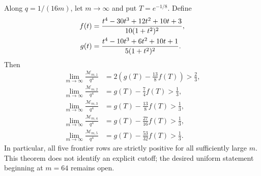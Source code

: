 \begin{theorem}
\label{thm:terminal-modal-static-frontier-first-order}
Along $q=1/(16m)$, let $m\to\infty$ and put $T=e^{-1/8}$.  Define
\begin{align}
 f(t)&=\frac{t^4-30t^3+12t^2+10t+3}
 {10(1+t^2)^2},\notag\\
 g(t)&=\frac{t^4-10t^3+6t^2+10t+1}
 {5(1+t^2)^2}.
 \label{eq:terminal-modal-static-frontier-fg}
\end{align}
Then
\begin{align}
 \lim_{m\to\infty}\frac{\mathcal M_{m,1}}{q^4}
 &=2\left(g(T)-\frac{13}{8}f(T)\right)>\frac23,
 \label{eq:terminal-modal-static-frontier-limit-1}\\
 \lim_{m\to\infty}\frac{\mathcal M_{m,2}}{q^4}
 &=g(T)-\frac74f(T)>\frac13,
 \label{eq:terminal-modal-static-frontier-limit-2}\\
 \lim_{m\to\infty}\frac{\mathcal M_{m,3}}{q^4}
 &=g(T)-\frac{13}{8}f(T)>\frac13,
 \label{eq:terminal-modal-static-frontier-limit-3}\\
 \lim_{m\to\infty}\frac{\mathcal M_{m,4}}{q^4}
 &=g(T)-\frac{27}{16}f(T)>\frac13,
 \label{eq:terminal-modal-static-frontier-limit-4}\\
 \lim_{m\to\infty}\frac{\mathcal M_{m,5}}{q^4}
 &=g(T)-\frac{53}{32}f(T)>\frac13.
 \label{eq:terminal-modal-static-frontier-limit-5}
\end{align}
In particular, all five frontier rows are strictly positive for all
sufficiently large $m$.  This theorem does not identify an explicit cutoff;
the desired uniform statement beginning at $m=64$ remains open.
\end{theorem}

